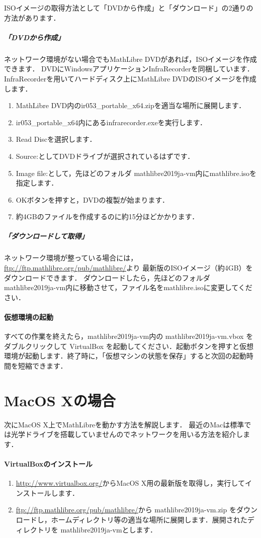 \documentclass[a4j]{ltjsarticle}
\newcommand{\ir}{ir053\_portable\_x64}
\newcommand{\vm}{mathlibre2019ja-vm}
\begin{document}
ISOイメージの取得方法として「DVDから作成」と「ダウンロード」の2通りの方法があります．
\subparagraph{「DVDから作成」}
ネットワーク環境がない場合でもMathLibre DVDがあれば，ISOイメージを作成できます．
DVDにWindowsアプリケーションInfraRecorderを同梱しています．
InfraRecorderを用いてハードディスク上にMathLibre DVDのISOイメージを作成
します．
\begin{enumerate}
 \item MathLibre DVD内の\ir.zipを適当な場所に展開します．
 \item \ir 内にあるinfrarecorder.exeを実行します．
 \item Read Discを選択します．
 \item Source:としてDVDドライブが選択されているはずです．
 \item Image file:として，先ほどのフォルダ \vm 内にmathlibre.isoを指定します．
 \item OKボタンを押すと，DVDの複製が始まります．
 \item 約4GBのファイルを作成するのに約15分ほどかかります．
\end{enumerate}
\subparagraph{「ダウンロードして取得」}

ネットワーク環境が整っている場合には，
\url{ftp://ftp.mathlibre.org/pub/mathlibre/}より
最新版のISOイメージ（約4GB）をダウンロードできます．
ダウンロードしたら，先ほどのフォルダ \vm 内に移動させて，ファイル名をmathlibre.isoに変更してください．

\paragraph{仮想環境の起動}
すべての作業を終えたら，\vm 内の \vm.vbox をダブルクリックして
VirtualBox を起動してください．起動ボタンを押すと仮想環境が起動します．終了時に，「仮想マシンの状態を保存」すると次回の起動時間を短縮できます．

\section{MacOS Xの場合}
次にMacOS X上でMathLibreを動かす方法を解説します．
最近のMacは標準では光学ドライブを搭載していませんのでネットワークを用いる方法を紹介します．

\paragraph{VirtualBoxのインストール}
\begin{enumerate}
 \item \url{http://www.virtualbox.org/}からMacOS X用の最新版を取得し，実行してインストールします．
 \item \url{ftp://ftp.mathlibre.org/pub/mathlibre/}から \vm.zip をダウンロードし，ホームディレクトリ等の適当な場所に展開します．展開されたディレクトリを \vm とします．
\end{enumerate}
\end{document}
